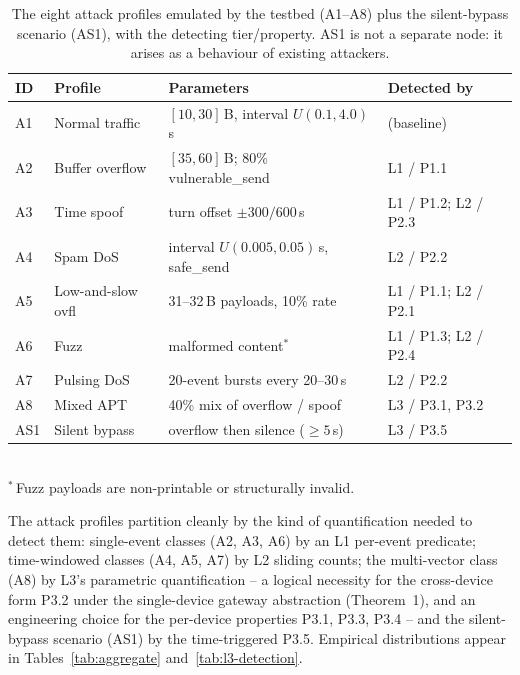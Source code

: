 \documentclass[runningheads]{llncs}
\begin{document}
\begin{table}[t]
\centering
\caption{The eight attack profiles emulated by the testbed (A1--A8) plus the silent-bypass scenario (AS1), with the detecting tier/property. AS1 is not a separate node: it arises as a behaviour of existing attackers.}
\label{tab:attacks}
\setlength{\tabcolsep}{4pt}
\renewcommand{\arraystretch}{1.15}
\footnotesize
\begin{tabular}{@{}l l l l@{}}
\toprule
\textbf{ID} & \textbf{Profile} & \textbf{Parameters} & \textbf{Detected by} \\
\midrule
A1 & Normal traffic         & $[10,30]$\,B, interval $U(0.1,4.0)$\,s  & (baseline) \\
A2 & Buffer overflow        & $[35,60]$\,B; 80\% \textsf{vulnerable\_send}           & L1 / P1.1 \\
A3 & Time spoof             & \textsf{turn} offset $\pm 300{/}600$\,s               & L1 / P1.2; L2 / P2.3 \\
A4 & Spam DoS               & interval $U(0.005,0.05)$\,s, \textsf{safe\_send}       & L2 / P2.2 \\
A5 & Low-and-slow ovfl      & 31--32\,B payloads, 10\% rate                          & L1 / P1.1; L2 / P2.1 \\
A6 & Fuzz                   & malformed content$^{*}$                                & L1 / P1.3; L2 / P2.4 \\
A7 & Pulsing DoS            & 20-event bursts every 20--30\,s                        & L2 / P2.2 \\
A8 & Mixed APT              & 40\% mix of overflow / spoof                           & L3 / P3.1, P3.2 \\
AS1 & Silent bypass       & overflow then silence ($\geq 5$\,s)                   & L3 / P3.5 \\

\bottomrule
\end{tabular}
\\[2pt]
{\footnotesize $^{*}$\,Fuzz payloads are non-printable or structurally invalid.}
\end{table}

The attack profiles partition cleanly by the kind of
quantification needed to detect them: single-event classes
(A2, A3, A6) by an L1 per-event predicate; time-windowed
classes (A4, A5, A7) by L2 sliding counts; the multi-vector class (A8) by L3's parametric quantification
-- a logical necessity for the cross-device form P3.2 under the single-device gateway abstraction (Theorem~1), and an engineering choice for the per-device properties P3.1, P3.3, P3.4 -- and the silent-bypass scenario (AS1) by the time-triggered P3.5.  Empirical distributions appear in
Tables~\ref{tab:aggregate} and~\ref{tab:l3-detection}.
\end{document}
